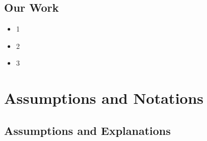 \documentclass{HZNUMCM}
\begin{document}
    \subsection{Our Work}
    \begin{itemize}
      \item 1
      \item 2
      \item 3
    \end{itemize}
  \section{Assumptions and Notations}
    \subsection{Assumptions and Explanations}
\end{document}
